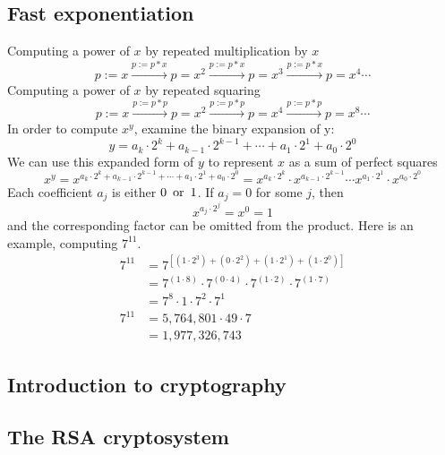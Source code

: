 \subsection{Fast exponentiation}
Computing a power of $x$ by repeated multiplication by $x$
\[
  p:=x \xrightarrow{p:=p*x} p = x^2 \xrightarrow{p:=p*x} p = x^3 \xrightarrow{p:=p*x} p=x^4 \cdots
\]
Computing a power of $x$ by repeated squaring
\[
  p:=x \xrightarrow{p:=p*p} p=x^2 \xrightarrow{p:=p*p} p=x^4 \xrightarrow{p:=p*p} p=x^8 \cdots
\]
In order to compute $x^y$, examine the binary expansion of y:
\[
  y = a_k \cdot 2^k + a_{k-1} \cdot 2^{k-1} + \cdots + a_1 \cdot 2^1 + a_0 \cdot 2^0
\]
We can use this expanded form of $y$ to represent $x$ as a sum of perfect squares
\[
  x^y = x^{a_k \cdot 2^k + a_{k-1} \cdot 2^{k-1} + \cdots + a_1 \cdot 2^1 + a_0 \cdot 2^0} = x^{a_{k} \cdot 2^{k}} \cdot x^{a_{k-1} \cdot 2^{k-1}} \cdots x^{a_{1} \cdot 2^{1}} \cdot x^{a_{0} \cdot 2^{0}}
\]
Each coefficient $a_j$ is either $0 \operatorname{~\text{or}~} 1$. If $a_j = 0$ for some $j$, then
\[
  x^{a_j \cdot 2^j} = x^0 = 1
\]
and the corresponding factor can be omitted from the product. Here is an example, computing $7^{11}$.
\begin{align*}
  7^{11} & = 7^{[(1 \cdot 2^3) + (0 \cdot 2^2) + (1 \cdot 2^1) + (1 \cdot 2^0)]}               \\
         & = 7^{(1 \cdot 8)} \cdot 7^{(0 \cdot 4)} \cdot 7^{(1 \cdot 2)} \cdot 7^{(1 \cdot 7)} \\
         & = 7^8 \cdot 1 \cdot 7^2 \cdot 7^1                                                   \\
  7^11   & = 5,764,801 \cdot 49 \cdot 7                                                        \\
         & = 1,977,326,743
\end{align*}
\subsection{Introduction to cryptography}
\subsection{The RSA cryptosystem}